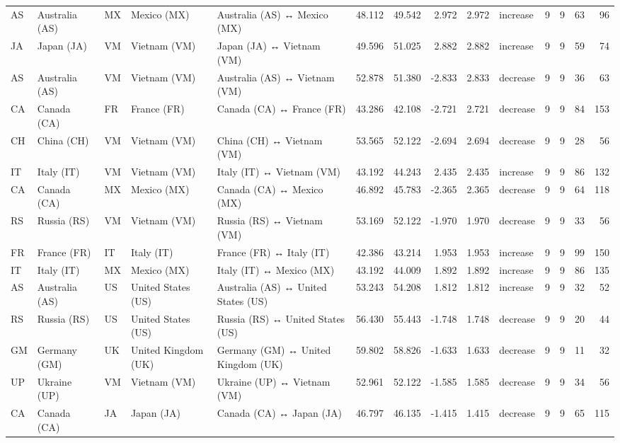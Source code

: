 \begin{tabular}{lllllrrrrlrrrr}
AS & Australia (AS) & MX & Mexico (MX) & Australia (AS) ↔ Mexico (MX) & 48.112 & 49.542 & 2.972 & 2.972 & increase & 9 & 9 & 63 & 96 \\
JA & Japan (JA) & VM & Vietnam (VM) & Japan (JA) ↔ Vietnam (VM) & 49.596 & 51.025 & 2.882 & 2.882 & increase & 9 & 9 & 59 & 74 \\
AS & Australia (AS) & VM & Vietnam (VM) & Australia (AS) ↔ Vietnam (VM) & 52.878 & 51.380 & -2.833 & 2.833 & decrease & 9 & 9 & 36 & 63 \\
CA & Canada (CA) & FR & France (FR) & Canada (CA) ↔ France (FR) & 43.286 & 42.108 & -2.721 & 2.721 & decrease & 9 & 9 & 84 & 153 \\
CH & China (CH) & VM & Vietnam (VM) & China (CH) ↔ Vietnam (VM) & 53.565 & 52.122 & -2.694 & 2.694 & decrease & 9 & 9 & 28 & 56 \\
IT & Italy (IT) & VM & Vietnam (VM) & Italy (IT) ↔ Vietnam (VM) & 43.192 & 44.243 & 2.435 & 2.435 & increase & 9 & 9 & 86 & 132 \\
CA & Canada (CA) & MX & Mexico (MX) & Canada (CA) ↔ Mexico (MX) & 46.892 & 45.783 & -2.365 & 2.365 & decrease & 9 & 9 & 64 & 118 \\
RS & Russia (RS) & VM & Vietnam (VM) & Russia (RS) ↔ Vietnam (VM) & 53.169 & 52.122 & -1.970 & 1.970 & decrease & 9 & 9 & 33 & 56 \\
FR & France (FR) & IT & Italy (IT) & France (FR) ↔ Italy (IT) & 42.386 & 43.214 & 1.953 & 1.953 & increase & 9 & 9 & 99 & 150 \\
IT & Italy (IT) & MX & Mexico (MX) & Italy (IT) ↔ Mexico (MX) & 43.192 & 44.009 & 1.892 & 1.892 & increase & 9 & 9 & 86 & 135 \\
AS & Australia (AS) & US & United States (US) & Australia (AS) ↔ United States (US) & 53.243 & 54.208 & 1.812 & 1.812 & increase & 9 & 9 & 32 & 52 \\
RS & Russia (RS) & US & United States (US) & Russia (RS) ↔ United States (US) & 56.430 & 55.443 & -1.748 & 1.748 & decrease & 9 & 9 & 20 & 44 \\
GM & Germany (GM) & UK & United Kingdom (UK) & Germany (GM) ↔ United Kingdom (UK) & 59.802 & 58.826 & -1.633 & 1.633 & decrease & 9 & 9 & 11 & 32 \\
UP & Ukraine (UP) & VM & Vietnam (VM) & Ukraine (UP) ↔ Vietnam (VM) & 52.961 & 52.122 & -1.585 & 1.585 & decrease & 9 & 9 & 34 & 56 \\
CA & Canada (CA) & JA & Japan (JA) & Canada (CA) ↔ Japan (JA) & 46.797 & 46.135 & -1.415 & 1.415 & decrease & 9 & 9 & 65 & 115 \\

\end{tabular}
